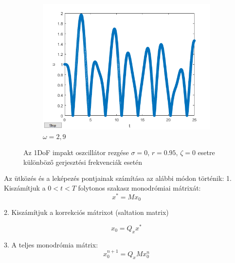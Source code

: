 \begin{figure}[h!]
\begin{subfigure}[b]{0.31\linewidth}
         \centering
         \includegraphics[width=1\linewidth]{graphics/ut_w29_r095_omega0_ksi0.png}
         \caption{$\omega=2,9$}
         \label{fig:w290_1}
     \end{subfigure}
     \caption{Az 1DoF impakt oszcillátor rezgése $\sigma=0$, $r=0.95$, $\zeta=0$ esetre különböző gerjesztési frekvenciák esetén}\label{fig:ut}
\end{figure}

Az ütközés és a leképezés pontjainak számítása az alábbi módon történik:
1. Kiszámítjuk a $0<t<T$ folytonos szakasz monodrómiai mátrixát:
\begin{equation}
x^*=M x_0
\end{equation}

2. Kiszámítjuk a korrekciós mátrixot (saltation matrix)

\begin{equation}
x_0=Q_x x^*
\end{equation}

3. A teljes monodrómia mátrix:
\begin{equation}
x_0^{n+1}=Q_x M x_0^n
\end{equation}

